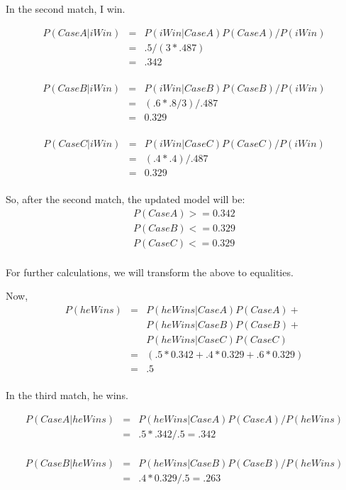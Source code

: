 \documentclass[10pt]{article}
\begin{document}
In the second match, I win.

\begin{eqnarray}
P(CaseA|iWin) &=& P(iWin|CaseA)P(CaseA)/P(iWin)\\
&=& .5/(3*.487)\\
&=& .342\\
\end{eqnarray}

\begin{eqnarray}
P(CaseB|iWin) &=& P(iWin|CaseB)P(CaseB)/P(iWin)\\
&=& (.6*.8/3)/.487\\
&=& 0.329\\
\end{eqnarray}

\begin{eqnarray}
P(CaseC|iWin) &=& P(iWin|CaseC)P(CaseC)/P(iWin)\\
&=& (.4*.4)/.487\\
&=& 0.329\\
\end{eqnarray}

So, after the second match, the updated model will be: 
\begin{eqnarray}
P(CaseA) >= 0.342\\
P(CaseB) <= 0.329\\
P(CaseC) <= 0.329\\
\end{eqnarray}

For further calculations, we will transform the above to equalities.

Now,
\begin{eqnarray}
P(heWins) &=& P(heWins|CaseA)P(CaseA)+\\
&&P(heWins|CaseB)P(CaseB)+\\
&&P(heWins|CaseC)P(CaseC)\\
&=&(.5*0.342+.4*0.329+.6*0.329)\\
&=&.5\\
\end{eqnarray}

In the third match, he wins.

\begin{eqnarray}
P(CaseA|heWins) &=& P(heWins|CaseA)P(CaseA)/P(heWins)\\
&=& .5*.342/.5 = .342\\
\end{eqnarray}

\begin{eqnarray}
P(CaseB|heWins) &=& P(heWins|CaseB)P(CaseB)/P(heWins)\\
&=& .4*0.329/.5 = .263\\
\end{eqnarray}
\end{document}
